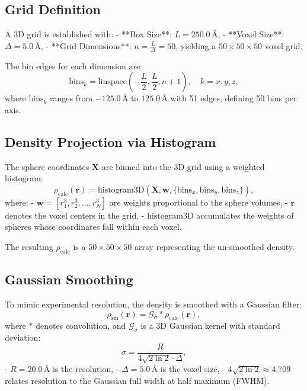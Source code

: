 \documentclass{article}
\begin{document}
\subsection{Grid Definition}

A 3D grid is established with:
- **Box Size**: \( L = 250.0 \, \text{\AA} \),
- **Voxel Size**: \( \Delta = 5.0 \, \text{\AA} \),
- **Grid Dimensions**: \( n = \frac{L}{\Delta} = 50 \), yielding a \( 50 \times 50 \times 50 \) voxel grid.

The bin edges for each dimension are:
\[
\text{bins}_k = \text{linspace}\left( -\frac{L}{2}, \frac{L}{2}, n + 1 \right), \quad k = x, y, z,
\]
where \( \text{bins}_k \) ranges from \(-125.0 \, \text{\AA}\) to \( 125.0 \, \text{\AA}\) with 51 edges, defining 50 bins per axis.

\subsection{Density Projection via Histogram}

The sphere coordinates \( \mathbf{X} \) are binned into the 3D grid using a weighted histogram:
\[
\rho_{\text{calc}}(\mathbf{r}) = \text{histogram3D}(\mathbf{X}, \mathbf{w}, \{\text{bins}_x, \text{bins}_y, \text{bins}_z\}),
\]
where:
- \( \mathbf{w} = [r_1^3, r_2^3, \ldots, r_N^3] \) are weights proportional to the sphere volumes,
- \( \mathbf{r} \) denotes the voxel centers in the grid,
- \( \text{histogram3D} \) accumulates the weights of spheres whose coordinates fall within each voxel.

The resulting \( \rho_{\text{calc}} \) is a \( 50 \times 50 \times 50 \) array representing the un-smoothed density.

\subsection{Gaussian Smoothing}

To mimic experimental resolution, the density is smoothed with a Gaussian filter:
\[
\rho_{\text{sm}}(\mathbf{r}) = \mathcal{G}_{\sigma} * \rho_{\text{calc}}(\mathbf{r}),
\]
where \( * \) denotes convolution, and \( \mathcal{G}_{\sigma} \) is a 3D Gaussian kernel with standard deviation:
\[
\sigma = \frac{R}{4 \sqrt{2 \ln 2} \cdot \Delta},
\]
- \( R = 20.0 \, \text{\AA} \) is the resolution,
- \( \Delta = 5.0 \, \text{\AA} \) is the voxel size,
- \( 4 \sqrt{2 \ln 2} \approx 4.709 \) relates resolution to the Gaussian full width at half maximum (FWHM).
\end{document}
